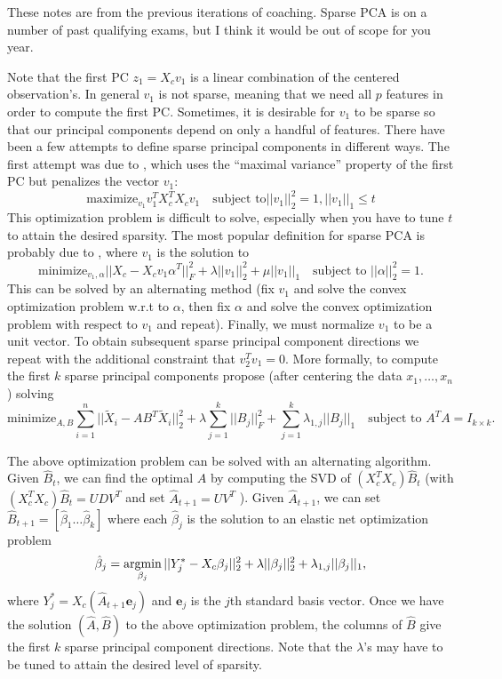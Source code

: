 These notes are from the previous iterations of coaching. Sparse PCA is on a number of past qualifying exams, but I think it would be out of scope for you year.

Note that the first PC $z_1 = X_c v_1$ is a linear combination of the centered observation's. In general $v_1$ is not sparse, meaning that we need all $p$ features in order to compute the first PC. Sometimes, it is desirable for $v_1$ to be sparse so that our principal components depend on only a handful of features. There have been a few attempts to define sparse principal components in different ways. The first attempt was due to \cite{Jolliffe2003}, which uses the “maximal variance” property of the first PC but penalizes the vector $v_1$:
$$\text{maximize}_{v_1} v_1^T X_c^T X_c v_1 \quad \text{subject to} \vert \vert v_1 \vert \vert_2^2 =1, \vert \vert v_1 \vert \vert_1 \leq t $$
This optimization problem is difficult to solve, especially when you have to tune $t$ to attain the desired sparsity. The most popular definition for sparse
PCA is probably due to \cite{Zou2006SparsePCA}, where $v_1$ is the solution to
$$\text{minimize}_{v_1,\alpha} \vert \vert X_c - X_cv_1 \alpha^T \vert \vert_F^2 +\lambda \vert \vert v_1 \vert \vert_2^2+\mu \vert \vert v_1 \vert \vert_1 \quad \text{subject to } \vert \vert \alpha \vert \vert_2^2 =1.$$
This can be solved by an alternating method (fix $v_1$ and solve the convex optimization problem w.r.t to $\alpha$, then fix $\alpha$ and solve the convex optimization problem with respect to $v_1$ and repeat). Finally, we must normalize $v_1$ to be a unit vector. To obtain subsequent sparse principal component directions we repeat with the additional constraint that $v_2^T v_1=0$.  More formally, to compute the first $k$ sparse principal components  \cite{Zou2006SparsePCA} propose (after centering the data $x_1,\dots, x_n$) solving $$\text{minimize}_{A,B}  \sum_{i=1}^n \vert \vert \widetilde{X}_i - AB^T \widetilde{X}_i \vert \vert_2^2 + \lambda \sum_{j=1}^k  \vert \vert B_j \vert \vert_F^2+\sum_{j=1}^k \lambda_{1,j} \vert \vert B_j \vert \vert_1 \quad \text{subject to } A^T A =I_{k \times k}.$$

The above optimization problem can be solved with an alternating algorithm. Given $\hat{B}_t$, we can find the optimal $A$ by computing the SVD  of $(X_c^T X_c)\hat{B}_t$ (with $(X_c^T X_c)\hat{B}_t =UDV^T$ and set $\hat{A}_{t+1} =U V^T$ ). Given $\hat{A}_{t+1}$, we can set $\hat{B}_{t+1} = [\hat{\beta}_1 \dots \hat{\beta}_k]$ where each $\hat{\beta}_j$ is the solution to an elastic net optimization problem $$\hat{\beta}_j = \operatorname*{argmin}\limits_{\beta_j} \vert \vert Y_j^* - X_c \beta_j \vert \vert_2^2 + \lambda \vert \vert \beta_j \vert \vert_2^2 + \lambda_{1,j} \vert \vert \beta_j \vert \vert_1,$$ where $Y_j^* =X_c (\hat{A}_{t+1} \bm{e}_j)$ and $\bm{e}_j$ is the $j$th standard basis vector. Once we have the solution $(\hat{A},\hat{B})$ to the above optimization problem, the columns of $\hat{B}$ give the first $k$ sparse principal component directions. Note that the $\lambda$'s may have to be tuned to attain the desired level of sparsity. 



